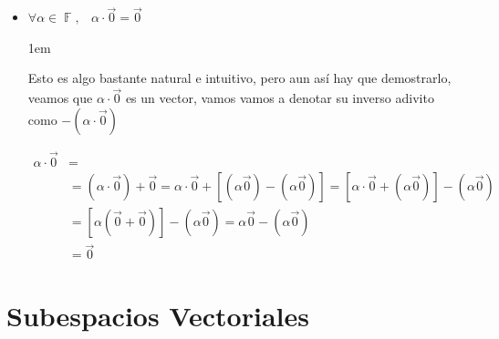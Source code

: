 \documentclass[12pt, fleqn]{report}                             %
\newenvironment{SmallIndentation}[1][0.75em]                    %
        {\begin{adjustwidth}{#1}{}\begin{footnotesize}}             %
        {\end{footnotesize}\end{adjustwidth}}                       %
\DeclareMathOperator \Space {\quad}                             %
\DeclareMathOperator \MiniSpace {\;}                            %
\theoremstyle{break}                                            %
\DeclareMathOperator \GenericField {\mathbb{F}}                 %
\begin{document}
\begin{itemize}
\begin{SmallIndentation}[1em]
                    \end{SmallIndentation}


                \item $\forall \alpha \in \GenericField, \MiniSpace \alpha \cdot \vec{0} = \vec{0}$

                    \begin{SmallIndentation}[1em]
                        Esto es algo bastante natural e intuitivo, pero aun así hay que demostrarlo, 
                        veamos que $\alpha \cdot \vec{0}$ es un vector, vamos vamos a denotar su inverso
                        adivito como $- (\alpha \cdot \vec{0})$

                        \begin{equation*}
                        \begin{split}
                            \alpha \cdot \vec{0} &=                                                           \\
                                            &= (\alpha \cdot \vec{0}) + \vec{0} 
                                             = \alpha \cdot \vec{0} + [ (\alpha \vec{0}) - (\alpha \vec{0}) ]
                                             = [\alpha \cdot \vec{0} +  (\alpha \vec{0})] - (\alpha \vec{0})  \\
                                            &= [\alpha (\vec{0} + \vec{0})] - (\alpha \vec{0})                 
                                             = \alpha \vec{0} - (\alpha \vec{0})                              \\
                                            &= \vec{0}
                        \end{split}
                        \end{equation*}

                    \end{SmallIndentation}

            \end{itemize}


    \chapter{Subespacios Vectoriales}
\end{document}
